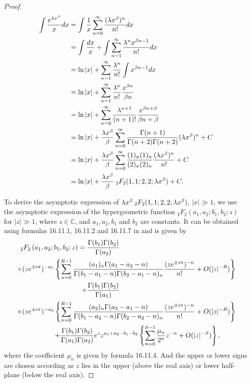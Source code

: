 \documentclass[smallextended]{svjour3}
\begin{document}
\begin{proof}
\begin{align}
\int \frac{e^{\lambda x^\beta}}{x}dx&=\int\frac{1}{x}\sum\limits_{n=0}^{\infty}\frac{(\lambda x^\beta)^n}{n!}dx \nonumber\\&=\int\frac{dx}{x}+\int\sum\limits_{n=1}^{\infty}\frac{\lambda^n x^{\beta n-1}}{n!}dx
\nonumber\\&=\ln{|x|}+\sum\limits_{n=1}^{\infty}\frac{\lambda^n}{n!}\int x^{\beta n-1} dx
\nonumber\\&=\ln{|x|}+\sum\limits_{n=1}^{\infty}\frac{\lambda^n}{n!}\frac{x^{\beta n}}{\beta n}
\nonumber\\&=\ln{|x|}+\sum\limits_{n=0}^{\infty}\frac{\lambda^{n+1}}{(n+1)!}\frac{x^{\beta n+\beta}}{\beta n+\beta}
\nonumber\\&=\ln{|x|}+\frac{\lambda x^\beta}{\beta}\sum\limits_{n=0}^{\infty}\frac{\Gamma(n+1)}{\Gamma(n+2)\Gamma(n+2)}(\lambda x^\beta)^{n}+C
\nonumber\\&=\ln{|x|}+\frac{\lambda x^\beta}{\beta}\sum\limits_{n=0}^{\infty}\frac{(1)_n (1)_n}{(2)_n (2)_n}\frac{(\lambda x^\beta)^{n}}{n!}+C
\nonumber\\&=\ln{|x|}+\frac{\lambda x^\beta}{\beta}\hspace{.075cm}   _{2}F_{2}(1,1;2,2;\lambda x^\beta)+C.
\label{e-i-pro}
\end{align}

To derive the asymptotic expression of $\lambda x^\beta \hspace{.075cm} _{2}F_{2}(1,1;2,2;\lambda x^\beta)$, $|x|\gg 1$, we use the asymptotic expression of the hypergeometric function ${}_2F_2\left(a_1,a_2;b_1,b_2;z\right)$ for $|z|\gg 1$, where $z\in \mathbb{C}$, and $a_1,a_2,b_1$ and $b_2$ are constants. It can be obtained using formulas 16.11.1, 16.11.2 and 16.11.7 in \cite{ND} and is given by
\begin{eqnarray}
\hspace{-.5cm}{}_2F_2\left(a_1,a_2;b_1,b_2;z\right)=\frac{\Gamma(b_1)\Gamma(b_2)}{\Gamma(a_2)}\hspace{6cm}\nonumber\\ \times(ze^{\pm i\pi})^{-a_1}\left\{\sum\limits_{n=0}^{R-1}\frac{(a_1)_n \Gamma(a_1-a_2-n)}{\Gamma(b_1-a_1-n)\Gamma(b_2-a_1-n)_n}\frac{(ze^{\pm i\pi})^{-n}}{n!}+O(|z|^{-R})\right\}\nonumber\\+
\frac{\Gamma(b_1)\Gamma(b_2)}{\Gamma(a_1)}\hspace{6cm}\nonumber\\ \times(ze^{\pm i\pi})^{-a_2}\left\{\sum\limits_{n=0}^{R-1}\frac{(a_2)_n \Gamma(a_2-a_1-n)}{\Gamma(b_1-a_2-n)\Gamma(b_2-a_2-n)_n}\frac{(ze^{\pm i\pi})^{-n}}{n!}+O(|z|^{-R})\right\}
\nonumber\\
+\frac{\Gamma(b_1)\Gamma(b_2)}{\Gamma(a_1)\Gamma(a_2)} e^{z}z^{a_1+a_2-b_1-b_2}\left\{\sum\limits_{n=0}^{S-1}\frac{\mu_n}{2^n}z^{-n}+O(|z|^{-S})\right\},\hspace{.8cm}
\label{asy2-2}
\end{eqnarray}
where the coefficient $\mu_n$ is given by formula 16.11.4. And the upper or lower signs are chosen according as $z$ lies in the upper (above the real axis) or lower half-plane (below the real axis).


\end{proof}
\end{document}
